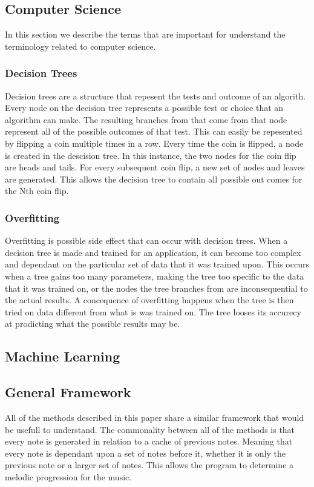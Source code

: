 \documentclass{sig-alternate}
\begin{document}
\subsection{Computer Science}
\label{sec:computerscience}
	In this section we describe the terms that are important for understand the terminology related to computer science.
\subsubsection{Decision Trees}
\label{sec:decision_trees}
	Decision trees are a structure that repesent the tests and outcome of an algorith. Every node on the decision tree represents a possible test or choice that an algorithm can make. The resulting branches from that come from that node represent all of the possible outcomes of that test. This can easily be repesented by flipping a coin multiple times in a row. Every time the coin is flipped, a node is created in the descision tree. In this instance, the two nodes for the coin flip are heads and tails. For every subsequent coin flip, a new set of nodes and leaves are generated. This allows the decision tree to contain all possible out comes for the Nth coin flip. 

\subsubsection{Overfitting}
\label{sec:overfitting}
	Overfitting is possible side effect that can occur with decision trees. When a decision tree is made and trained for an application, it can become too complex and dependant on the particular set of data that it was trained upon. This occurs when a tree gains too many parameters, making the tree too specific to the data that it was trained on, or the nodes the tree branches from are inconsequential to the actual results. A concequence of overfitting  happens when the tree is then tried on data different from what is was trained on. The tree looses its accurecy at prodicting what the possible results may be. 

\subsection{Machine Learning}
\label{sec:machinelearning}

\subsection{General Framework}
\label{sec:framework}
	All of the methods described in this paper share a similar framework that would be usefull to understand. The commonality between all of the methods is that every note is generated in relation to a cache of previous notes. Meaning that every note is dependant upon a set of notes before it, whether it is only the previous note or a larger set of notes. This allows the program to determine a melodic progression for the music. 
\end{document}
